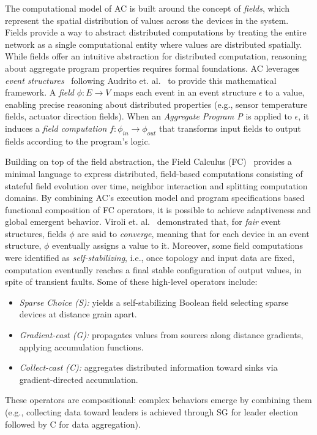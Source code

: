 \documentclass[12pt]{article}
\begin{document}
The computational model of AC is built around the concept of \textit{fields}, which represent the spatial distribution of values across the devices in the system.
Fields provide a way to abstract distributed computations by treating the entire network as a single computational entity where values are distributed spatially.
%
While fields offer an intuitive abstraction for distributed computation, reasoning about aggregate program properties requires formal foundations. AC leverages \textit{event structures}~\cite{nielsen1981petri} following Audrito et. al.~\cite{audrito2018space} to provide this mathematical framework.
%
A \textit{field} $\phi:E \rightarrow V$ maps each event in an event structure $\epsilon$ to a value, enabling precise reasoning about distributed properties (e.g., sensor temperature fields, actuator direction fields). When an \textit{Aggregate Program P} is applied to $\epsilon$, it induces a \textit{field computation} $f:\phi_{in}\rightarrow\phi_{out}$ that transforms input fields to output fields according to the program's logic.

Building on top of the field abstraction, the Field Calculus (FC)~\cite{viroli2013calculus} provides a minimal language to express distributed, field-based computations consisting of stateful field evolution over time, neighbor interaction and splitting computation domains.
By combining AC's execution model and program specifications based functional composition of FC operators, it is possible to achieve
adaptiveness and global emergent behavior. 
Viroli et. al.~\cite{viroli2018engineering} demonstrated that, for \textit{fair} event structures, fields $\phi$ are said to \textit{converge}, meaning that for each device in an event structure, $\phi$ eventually assigns a value to it. 
Moreover, some field computations were identified as \textit{self-stabilizing}, i.e., once topology and input data are fixed, computation eventually reaches a final
stable configuration of output values, in spite of transient faults. Some of these high-level operators include:
\begin{itemize}
	\item \textit{Sparse Choice (S):} yields a self-stabilizing Boolean field selecting sparse devices at distance grain apart.
	\item \textit{Gradient-cast (G):} propagates values from sources along distance gradients, applying accumulation functions.
	\item \textit{Collect-cast (C):} aggregates distributed information toward sinks via gradient-directed accumulation.
\end{itemize}
These operators are compositional: complex behaviors emerge by combining them (e.g., collecting data toward leaders is achieved through SG for leader election followed by C for data aggregation).
\end{document}
